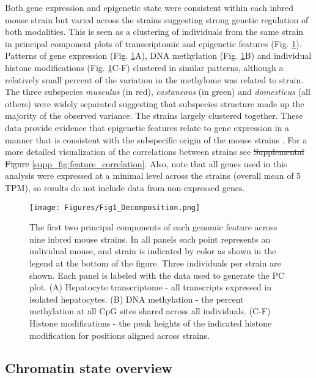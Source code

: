 \documentclass[
  11pt,
]{article}
\providecommand{\DIFaddtex}[1]{{\protect\color{blue}\uwave{#1}}} %
\providecommand{\DIFdeltex}[1]{{\protect\color{red}\sout{#1}}}                      %
\providecommand{\DIFaddbegin}{} %
\providecommand{\DIFaddend}{} %
\providecommand{\DIFdelbegin}{} %
\providecommand{\DIFdelend}{} %
\providecommand{\DIFadd}[1]{\texorpdfstring{\DIFaddtex{#1}}{#1}} %
\providecommand{\DIFdel}[1]{\texorpdfstring{\DIFdeltex{#1}}{}} %
\newcommand{\DIFscaledelfig}{0.5}
\newlength{\DIFdelgraphicswidth} %
\newlength{\DIFdelgraphicsheight} %
\newcommand{\DIFaddincludegraphics}[2][]{{\color{blue}\fbox{\DIFOincludegraphics[#1]{#2}}}} %
\newcommand{\DIFdelincludegraphics}[2][]{%
\sbox{\DIFdelgraphicsbox}{\DIFOincludegraphics[#1]{#2}}%
\settoboxwidth{\DIFdelgraphicswidth}{\DIFdelgraphicsbox} %
\settoboxtotalheight{\DIFdelgraphicsheight}{\DIFdelgraphicsbox} %
\scalebox{\DIFscaledelfig}{%
\parbox[b]{\DIFdelgraphicswidth}{\usebox{\DIFdelgraphicsbox}\\[-\baselineskip] \rule{\DIFdelgraphicswidth}{0em}}\llap{\resizebox{\DIFdelgraphicswidth}{\DIFdelgraphicsheight}{%
\setlength{\unitlength}{\DIFdelgraphicswidth}%
\begin{picture}(1,1)%
\thicklines\linethickness{2pt} %
{\color[rgb]{1,0,0}\put(0,0){\framebox(1,1){}}}%
{\color[rgb]{1,0,0}\put(0,0){\line( 1,1){1}}}%
{\color[rgb]{1,0,0}\put(0,1){\line(1,-1){1}}}%
\end{picture}%
}\hspace*{3pt}}} %
} %
\DeclareRobustCommand{\DIFaddbegin}{\DIFOaddbegin \let\includegraphics\DIFaddincludegraphics} %
\DeclareRobustCommand{\DIFaddend}{\DIFOaddend \let\includegraphics\DIFOincludegraphics} %
\DeclareRobustCommand{\DIFdelbegin}{\DIFOdelbegin \let\includegraphics\DIFdelincludegraphics} %
\DeclareRobustCommand{\DIFdelend}{\DIFOaddend \let\includegraphics\DIFOincludegraphics} %
\begin{document}
Both gene expression and epigenetic state were consistent within each
inbred mouse strain but varied across the strains suggesting strong
genetic regulation of both modalities. This is seen as a clustering of
individuals from the same strain in principal component plots of
transcriptomic and epigenetic features (Fig. \ref{fig:pc_plots}).
Patterns of gene expression (Fig. \ref{fig:pc_plots}A), DNA methylation
(Fig. \ref{fig:pc_plots}B) and individual histone modifications (Fig.
\ref{fig:pc_plots}C-F) clustered in similar patterns, although a
relatively small percent of the variation in the methylome was related
to strain. The three subspecies \textit{musculus} (in red),
\textit{castaneous} (in green) and \textit{domesticus} (all others) were
widely separated suggesting that subspecies structure made up the
majority of the observed variance. The  strains largely
clustered together. These data provide evidence that epigenetic features
relate to gene expression in a manner that is consistent with the
subspecific origin of the mouse strains \citep{yang2007subspecific}. For
a more detailed visualization of the correlations between strains see
\DIFdelbegin \DIFdel{Supplemental Figure }\DIFdelend \DIFaddbegin \DIFadd{Supp. Fig. }\DIFaddend \ref{supp_fig:feature_correlation}. Also, note that all genes
used in this analysis were expressed at a minimal level across the
strains (overall mean of 5 TPM), so results do not include data from
non-expressed genes.

\begin{figure}[ht!]
\texttt{[image: Figures/Fig1\_Decomposition.png]} 
\caption{The first two principal components of each genomic 
feature across nine inbred mouse strains. In all panels each 
point represents an individual mouse, and strain is indicated 
by color as shown in the legend at the bottom of the figure. 
Three individuals per strain are shown. Each panel is labeled 
with the data used to generate the PC plot. (A) Hepatocyte 
transcriptome - all transcripts expressed in isolated hepatocytes. 
(B) DNA methylation - the percent methylation at all CpG sites 
shared across all individuals. (C-F) Histone modifications - 
the peak heights of the indicated histone modification for
positions aligned across strains.}
\label{fig:pc_plots}
\end{figure}

\hypertarget{chromatin-state-overview}{%
\subsection{Chromatin state overview}\label{chromatin-state-overview}}
\end{document}
